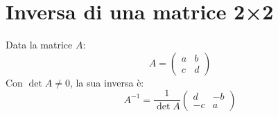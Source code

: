 \section{Inversa di una matrice 2×2}
Data la matrice $A$:
	\begin{equation*}
	A=\left(\begin{array}{cc}
		a & b \\
		c & d
	\end{array}\right)
\end{equation*}
Con $\det A\neq 0$, la sua inversa è:
\begin{equation*}
	A^{-1}=\frac{1}{\det A}\left(\begin{array}{cc}
		d & -b \\
		-c & a
	\end{array}\right)
\end{equation*}
